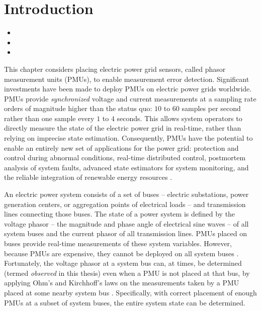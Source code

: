 \section{Introduction}
\label{sec:intro-pmu}

\begin{framed}
\begin{itemize}
        \item {} 
	
	\item {}

	\item {}
\end{itemize}
\end{framed}
               


This chapter considers placing electric power grid sensors, called phasor measurement units (PMUs), to enable measurement error detection.
Significant investments have been made to deploy PMUs on electric power grids worldwide. PMUs provide \emph{synchronized} voltage and current measurements at a sampling rate orders 
of magnitude higher than the status quo: $10$ to $60$ samples per second rather than one sample every $1$ to $4$ seconds.  This allows system operators to directly measure the state of the electric power grid in real-time, rather than 
relying on imprecise state estimation. Consequently, PMUs have the potential to enable
an entirely new set of applications for the power grid:  protection and control during abnormal conditions, real-time distributed control, postmortem analysis of system faults,
advanced state estimators for system monitoring, and the reliable integration of renewable energy resources \cite{Naspi10}.

An electric power system consists of a set of buses  -- electric substations, power generation centers, or aggregation points of electrical loads -- and transmission lines connecting those buses.
The state of a power system is defined by the voltage phasor -- the magnitude and phase angle of electrical sine waves -- of all system buses and the current phasor of all transmission lines.
PMUs placed on buses provide real-time measurements of these system variables.
However, because PMUs are expensive, they cannot be deployed on all system buses \cite{Baldwin93}\cite{LaRee10}. Fortunately, the voltage phasor at a system bus can, at times, 
be determined (termed {\it observed} in this thesis) even when a PMU is not placed at that bus, by applying Ohm's and Kirchhoff's laws
on the measurements taken by a PMU placed at some nearby system bus \cite{Baldwin93}\cite{Brueni05}. Specifically, with correct placement of enough PMUs at a subset of system buses, the entire system state can be determined. 

